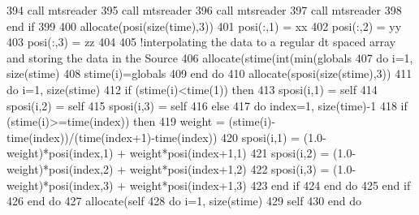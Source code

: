 \begin{DoxyCode}
394         \textcolor{keyword}{call }mtsreader%
395         \textcolor{keyword}{call }mtsreader%
396         \textcolor{keyword}{call }mtsreader%
397         \textcolor{keyword}{call }mtsreader%
398 \textcolor{keywordflow}{    end if}
399     
400     \textcolor{keyword}{allocate}(posi(\textcolor{keyword}{size}(time),3))
401     posi(:,1) = xx
402     posi(:,2) = yy
403     posi(:,3) = zz
404     
405     \textcolor{comment}{!interpolating the data to a regular dt spaced array and storing the data in the Source}
406     \textcolor{keyword}{allocate}(stime(int(min(globals%
407     \textcolor{keywordflow}{do} i=1, \textcolor{keyword}{size}(stime)
408         stime(i)=globals%
409 \textcolor{keywordflow}{    end do}
410     \textcolor{keyword}{allocate}(sposi(\textcolor{keyword}{size}(stime),3))
411     \textcolor{keywordflow}{do} i=1, \textcolor{keyword}{size}(stime)
412         \textcolor{keywordflow}{if} (stime(i)<time(1)) \textcolor{keywordflow}{then}
413             sposi(i,1) = self%
414             sposi(i,2) = self%
415             sposi(i,3) = self%
416         \textcolor{keywordflow}{else}
417             \textcolor{keywordflow}{do} index=1, \textcolor{keyword}{size}(time)-1
418                 \textcolor{keywordflow}{if} (stime(i)>=time(index)) \textcolor{keywordflow}{then}
419                     weight = (stime(i)-time(index))/(time(index+1)-time(index))
420                     sposi(i,1) = (1.0-weight)*posi(index,1) + weight*posi(index+1,1)
421                     sposi(i,2) = (1.0-weight)*posi(index,2) + weight*posi(index+1,2)
422                     sposi(i,3) = (1.0-weight)*posi(index,3) + weight*posi(index+1,3)
423 \textcolor{keywordflow}{                end if}
424 \textcolor{keywordflow}{            end do}
425 \textcolor{keywordflow}{        end if}
426 \textcolor{keywordflow}{    end do}
427     \textcolor{keyword}{allocate}(self%
428     \textcolor{keywordflow}{do} i=1, \textcolor{keyword}{size}(stime)
429         self%
430 \textcolor{keywordflow}{    end do}
\end{DoxyCode}
\mbox{\label{namespacesources__mod_a66fda4b5042b49bb82d085166c06fcb9}} 
